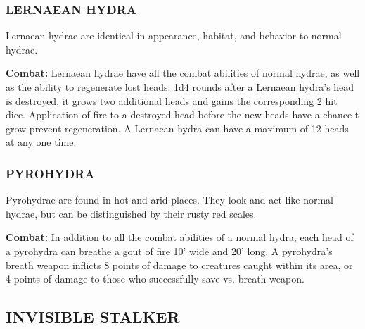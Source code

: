 \begin{multicols}{2}
\subsubsection{LERNAEAN HYDRA}

Lernaean hydrae are identical in appearance, habitat, and behavior to normal hydrae.

\textbf{Combat:} Lernaean hydrae have all the combat abilities of normal hydrae, as well as the ability to regenerate lost heads. 1d4 rounds after a Lernaean hydra's head is destroyed, it grows two additional heads and gains the corresponding 2 hit dice. Application of fire to a destroyed head before the new heads have a chance t grow prevent regeneration. A Lernaean hydra can have a maximum of 12 heads at any one time.

\subsubsection{PYROHYDRA}

Pyrohydrae are found in hot and arid places. They look and act like normal hydrae, but can be distinguished by their rusty red scales.

\textbf{Combat:} In addition to all the combat abilities of a normal hydra, each head of a pyrohydra can breathe a gout of fire 10' wide and 20' long. A pyrohydra's breath weapon inflicts 8 points of damage to creatures caught within its area, or 4 points of damage to those who successfully save vs. breath weapon.

\noindent
\begin{minipage}{\columnwidth}

\vspace{1em}

\subsection{INVISIBLE STALKER}


\end{minipage}
\end{multicols}
